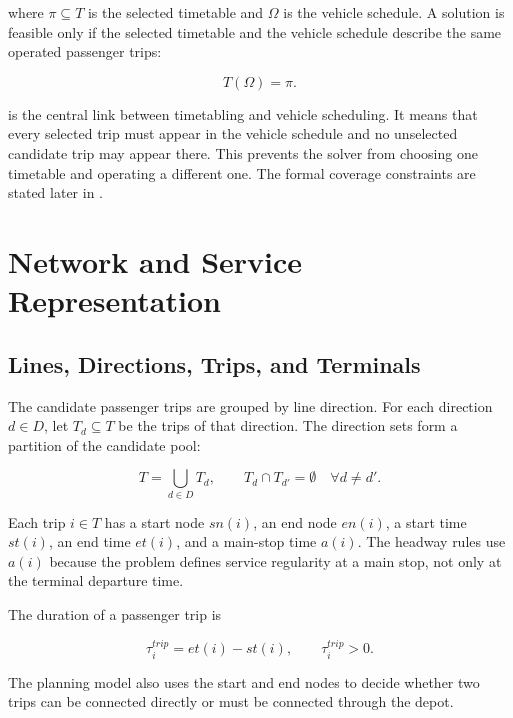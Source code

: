 where \(\pi\subseteq T\) is the selected timetable and \(\Omega\) is the vehicle
schedule. A solution is feasible only if the selected timetable and the vehicle
schedule describe the same operated passenger trips:

\begin{equation}
T(\Omega)=\pi .
\label{eq:tt-vs-equality}
\end{equation}

 is the central link between timetabling and vehicle
scheduling. It means that every selected trip must appear in the vehicle
schedule and no unselected candidate trip may appear there. This prevents the
solver from choosing one timetable and operating a different one. The formal
coverage constraints are stated later in
.

\section{Network and Service Representation}

\subsection{Lines, Directions, Trips, and Terminals}

The candidate passenger trips are grouped by line direction. For each direction
\(d\in D\), let \(T_d\subseteq T\) be the trips of that direction. The
direction sets form a partition of the candidate pool:

\begin{equation}
T=\bigcup_{d\in D}T_d,
\qquad
T_d\cap T_{d'}=\emptyset
\quad \forall d\neq d'.
\label{eq:trip-partition}
\end{equation}

Each trip \(i\in T\) has a start node \(sn(i)\), an end node \(en(i)\), a start
time \(st(i)\), an end time \(et(i)\), and a main-stop time \(a(i)\). The
headway rules use \(a(i)\) because the problem defines service regularity at a
main stop, not only at the terminal departure time.

The duration of a passenger trip is

\begin{equation}
\tau_i^{trip}=et(i)-st(i),
\qquad
\tau_i^{trip}>0.
\label{eq:trip-duration}
\end{equation}

The planning model also uses the start and end nodes to decide whether two trips
can be connected directly or must be connected through the depot.

